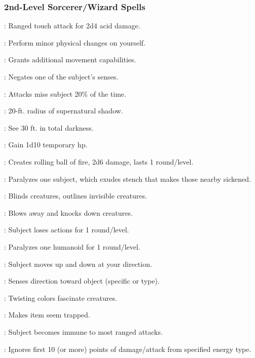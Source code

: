 \subsubsection{2nd-Level Sorcerer/Wizard Spells}
\begin{list}{}{\leftmargin=1em}
\item {}: Ranged touch attack for 2d4 acid damage.
\item {}: Perform minor physical changes on yourself.
\item {}: Grants additional movement capabilities.
\item {}: Negates one of the subject's senses.
\item {}: Attacks miss subject 20\% of the time.
\item {}: 20-ft. radius of supernatural shadow.
\item {}: See 30 ft. in total darkness.
\item {}: Gain 1d10 temporary hp.
\item {}: Creates rolling ball of fire, 2d6 damage, lasts 1 round/level.
\item {}: Paralyzes one subject, which exudes stench that makes those nearby sickened.
\item {}: Blinds creatures, outlines invisible creatures.
\item {}: Blows away and knocks down creatures.
\item {}: Subject loses actions for 1 round/level.
\item {}: Paralyzes one humanoid for 1 round/level.
\item {}: Subject moves up and down at your direction.
\item {}: Senses direction toward object (specific or type).
\item {}: Twisting colors fascinate creatures.
\item {}: Makes item seem trapped.
\item {}: Subject becomes immune to most ranged attacks.
\item {}: Ignores first 10 (or more) points of damage/attack from specified energy type.

\end{list}
